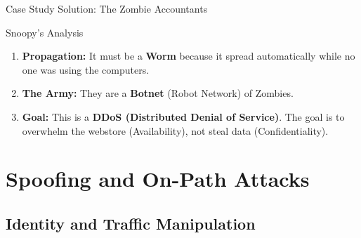 \documentclass[aspectratio=169]{beamer}  %
\begin{document}
\begin{frame}{Case Study Solution: The Zombie Accountants}
    \begin{exampleblock}{Snoopy's Analysis}
        \footnotesize
        \begin{enumerate}
            \item \textbf{Propagation:} It must be a \textbf{Worm} because it spread automatically while no one was using the computers.
            \item \textbf{The Army:} They are a \textbf{Botnet} (Robot Network) of Zombies.
            \item \textbf{Goal:} This is a \textbf{DDoS (Distributed Denial of Service)}. The goal is to overwhelm the webstore (Availability), not steal data (Confidentiality).
        \end{enumerate}
    \end{exampleblock}
    \begin{center}
    \end{center}
\end{frame}

\section{Spoofing and On-Path Attacks}
\subsection{Identity and Traffic Manipulation}
\end{document}
